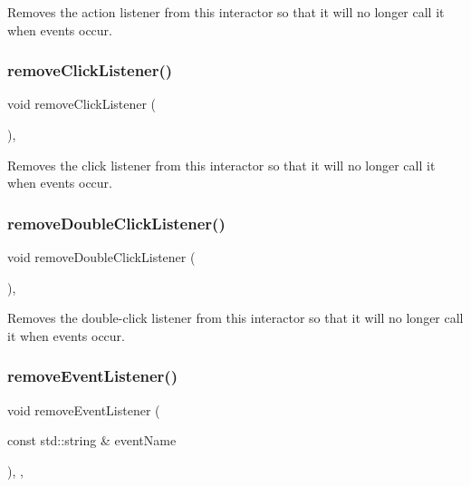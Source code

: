 Removes the action listener from this interactor so that it will no longer call it when events occur. 

\mbox{\label{classGInteractor_ad39d0325cde6b97ebda4b9d7787c633b}} 
\subsubsection{\texorpdfstring{remove\+Click\+Listener()}{removeClickListener()}}
{\footnotesize\ttfamily void remove\+Click\+Listener (\begin{DoxyParamCaption}{ }\end{DoxyParamCaption})\hspace{0.3cm}{\ttfamily [virtual]}, {\ttfamily [inherited]}}



Removes the click listener from this interactor so that it will no longer call it when events occur. 

\mbox{\label{classGInteractor_aa4250907e4cdd77349c04f0cf5cdd3d3}} 
\subsubsection{\texorpdfstring{remove\+Double\+Click\+Listener()}{removeDoubleClickListener()}}
{\footnotesize\ttfamily void remove\+Double\+Click\+Listener (\begin{DoxyParamCaption}{ }\end{DoxyParamCaption})\hspace{0.3cm}{\ttfamily [virtual]}, {\ttfamily [inherited]}}



Removes the double-\/click listener from this interactor so that it will no longer call it when events occur. 

\mbox{\label{classGObservable_acbcf1ed3a851ad8a3c17ef38d86b481d}} 
\subsubsection{\texorpdfstring{remove\+Event\+Listener()}{removeEventListener()}}
{\footnotesize\ttfamily void remove\+Event\+Listener (\begin{DoxyParamCaption}\item[{const std\+::string \&}]{event\+Name }\end{DoxyParamCaption})\hspace{0.3cm}{\ttfamily [protected]}, {\ttfamily [virtual]}, {\ttfamily [inherited]}}



